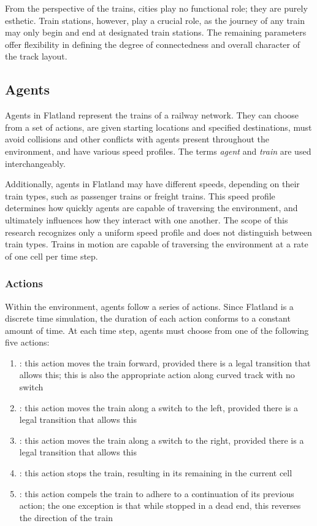 \documentclass[11pt]{article}
\begin{document}
\noindent From the perspective of the trains, cities play no functional role; they are purely esthetic. Train stations, however, play a crucial role, as the journey of any train may only begin and end at designated train stations.  The remaining parameters offer flexibility in defining the degree of connectedness and overall character of the track layout. \medskip


\subsection{Agents}
\label{sec:Agents}
Agents in Flatland represent the trains of a railway network.  They can choose from a set of actions, are given starting locations and specified destinations, must avoid collisions and other conflicts with agents present throughout the environment, and have various speed profiles.  The terms \textit{agent} and \textit{train} are used interchangeably.

Additionally, agents in Flatland may have different speeds, depending on their train types, such as passenger trains or freight trains.  This speed profile determines how quickly agents are capable of traversing the environment, and ultimately influences how they interact with one another.  The scope of this research recognizes only a uniform speed profile and does not distinguish between train types.  Trains in motion are capable of traversing the environment at a rate of one cell per time step.

\subsubsection{Actions}
\label{sec:Actions}
Within the environment, agents follow a series of actions.  Since Flatland is a discrete time simulation, the duration of each action conforms to a constant amount of time.    At each time step, agents must choose from one of the following five actions: 
\begin{enumerate}
  \item {}: this action moves the train forward, provided there is a legal transition that allows this; this is also the appropriate action along curved track with no switch
  \item {}: this action moves the train along a switch to the left, provided there is a legal transition that allows this
  \item {}: this action moves the train along a switch to the right, provided there is a legal transition that allows this
  \item {}: this action stops the train, resulting in its remaining in the current cell
  \item {}: this action compels the train to adhere to a continuation of its previous action; the one exception is that while stopped in a dead end, this reverses the direction of the train
\end{enumerate} \smallskip
\end{document}
